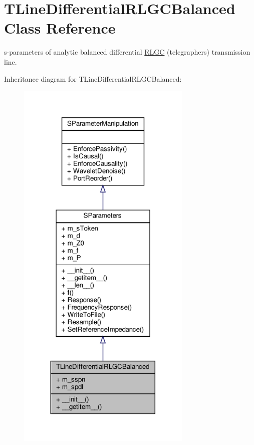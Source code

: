\hypertarget{classSignalIntegrity_1_1SParameters_1_1Devices_1_1TLineDifferentialRLGCBalanced_1_1TLineDifferentialRLGCBalanced}{}\section{T\+Line\+Differential\+R\+L\+G\+C\+Balanced Class Reference}
\label{classSignalIntegrity_1_1SParameters_1_1Devices_1_1TLineDifferentialRLGCBalanced_1_1TLineDifferentialRLGCBalanced}


s-\/parameters of analytic balanced differential \hyperlink{namespaceSignalIntegrity_1_1SParameters_1_1RLGC}{R\+L\+GC} (telegrapher\textquotesingle{}s) transmission line.  




Inheritance diagram for T\+Line\+Differential\+R\+L\+G\+C\+Balanced\+:\nopagebreak
\begin{figure}[H]
\begin{center}
\leavevmode
\includegraphics[width=236pt]{classSignalIntegrity_1_1SParameters_1_1Devices_1_1TLineDifferentialRLGCBalanced_1_1TLineDifferen0e32869498bf168ac50b2d0fc632c651}
\end{center}
\end{figure}


